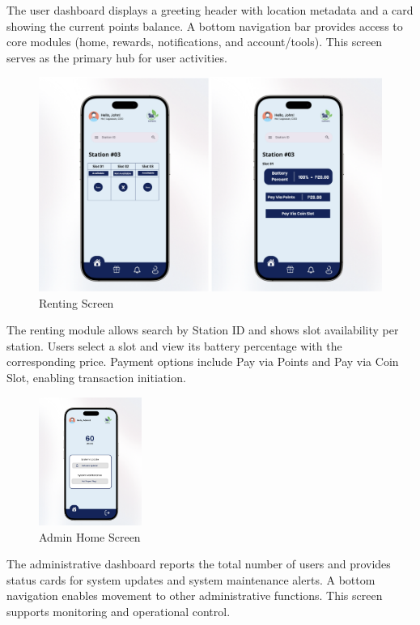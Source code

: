 {  The user dashboard displays a greeting header with location metadata and a card showing the current points balance. A bottom navigation bar provides access to core modules (home, rewards, notifications, and account/tools). This screen serves as the primary hub for user activities.
  
    \begin{figure}[H]
  	\centering
  	\caption{Renting  Screen}
  	\label{fig:renting}
  	\includegraphics[width=1\textwidth]{figures/renting.png}
  \end{figure}
  
  The renting module allows search by Station ID and shows slot availability per station. Users select a slot and view its battery percentage with the corresponding price. Payment options include Pay via Points and Pay via Coin Slot, enabling transaction initiation.
  
  \begin{figure}[H]
  	\centering
  	\caption{Admin Home  Screen}
  	\label{fig:admin}
  	\includegraphics[width=0.3\textwidth]{figures/admin.png}
  \end{figure}
  
  The administrative dashboard reports the total number of users and provides status cards for system updates and system maintenance alerts. A bottom navigation enables movement to other administrative functions. This screen supports monitoring and operational control.
  
}
